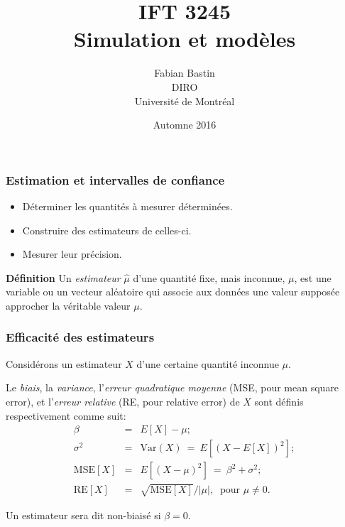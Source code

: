 \documentclass[t,usepdftitle=false]{beamer}
\title[IFT3245]{IFT 3245\\Simulation et modèles}
\author[Fabian Bastin]{Fabian Bastin\\DIRO\\Université de Montréal}
\date{Automne 2016}
\def\MSE{\mbox{MSE}}
\def\RE{\mbox{RE}}
\def\Var{\mbox{Var}}
\begin{document}
\frame{\titlepage}

\begin{frame}
\frametitle{Estimation et intervalles de confiance}

\begin{itemize}
\item
Déterminer les quantités à mesurer déterminées.
\item
Construire des estimateurs de celles-ci.
\item
Mesurer leur précision.
\end{itemize}

\mbox{}

{\bf Définition}
Un {\sl estimateur} $\hat{\mu}$ d'une quantité fixe, mais
inconnue, $\mu$, est une variable ou un vecteur aléatoire qui associe
aux données une valeur supposée approcher la véritable valeur $\mu$.

\end{frame}

\begin{frame}
\frametitle{Efficacité des estimateurs}

Considérons un estimateur $X$ d'une certaine quantité inconnue $\mu$.

\mbox{}

Le {\em biais}, la {\em variance}, l'{\em erreur quadratique moyenne} (MSE, pour
mean square error), et l'{\em erreur relative} (RE, pour relative error) de $X$
sont définis respectivement comme suit: 
\begin{eqnarray*}
 \beta     &=& E[X] -\mu;\\
 \sigma^2  &=& \Var(X) ~=~ E[(X - E[X])^2];\\
 \MSE[X]   &=& E[(X-\mu)^2] ~=~ \beta^2 + \sigma^2;\\
 \RE[X]    &=& \sqrt{\MSE[X]}/|\mu|, \ \mbox{ pour } \mu\not=0.
\end{eqnarray*}

\mbox{}

Un estimateur sera dit non-biaisé si $\beta = 0$.

\end{frame}
\end{document}
